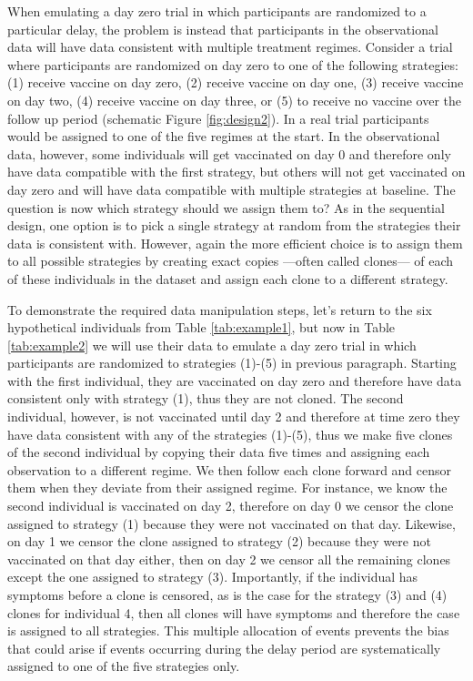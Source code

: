 \begin{appendix}
    When emulating a day zero trial in which participants are randomized to a particular delay, the problem is instead that participants in the observational data will have data consistent with multiple treatment regimes. Consider a trial where participants are randomized on day zero to one of the following strategies: (1) receive vaccine on day zero, (2) receive vaccine on day one, (3) receive vaccine on day two, (4) receive vaccine on day three, or (5) to receive no vaccine over the follow up period (schematic Figure \ref{fig:design2}). In a real trial participants would be assigned to one of the five regimes at the start. In the observational data, however, some individuals will get vaccinated on day 0 and therefore only have data compatible with the first strategy, but others will not get vaccinated on day zero and will have data compatible with multiple strategies at baseline. The question is now which strategy should we assign them to? As in the sequential design, one option is to pick a single strategy at random from the strategies their data is consistent with. However, again the more efficient choice is to assign them to all possible strategies by creating exact copies ---often called clones--- of each of these individuals in the dataset and assign each clone to a different strategy. 

    To demonstrate the required data manipulation steps, let's return to the six hypothetical individuals from Table \ref{tab:example1}, but now in Table \ref{tab:example2} we will use their data to emulate a day zero trial in which participants are randomized to strategies (1)-(5) in previous paragraph. Starting with the first individual, they are vaccinated on day zero and therefore have data consistent only with strategy (1), thus they are not cloned. The second individual, however, is not vaccinated until day 2 and therefore at time zero they have data consistent with any of the strategies (1)-(5), thus we make five clones of the second individual by copying their data five times and assigning each observation to a different regime. We then follow each clone forward and censor them when they deviate from their assigned regime. For instance, we know the second individual is vaccinated on day 2, therefore on day 0 we censor the clone assigned to strategy (1) because they were not vaccinated on that day. Likewise, on day 1 we censor the clone assigned to strategy (2) because they were not vaccinated on that day either, then on day 2 we censor all the remaining clones except the one assigned to strategy (3). Importantly, if the individual has symptoms before a clone is censored, as is the case for the strategy (3) and (4) clones for individual 4, then all clones will have symptoms and therefore the case is assigned to all strategies. This multiple allocation of events prevents the bias that could arise if events occurring during the delay period are systematically assigned to one of the five strategies only.


\end{appendix}
